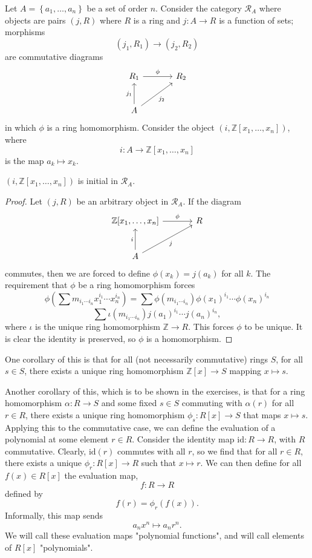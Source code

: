 Let $A=\left\{ a_1, \dots, a_n  \right\} $ be a set of order $n$. Consider the category $\mathscr{R} _A$ where objects are pairs $(j,R)$ where $R$ is a ring and $j : A \to R$ is a function of sets; morphisms
\[
	(j_1,R_1)\to (j_2,R_2)
\]
are commutative diagrams
\[\begin{tikzcd}[row sep=2.5em, column sep=3.5em]
	R_1 \arrow[r, "\phi "]&R_2\\
	A\arrow[u, "j_1"]\arrow[ru, "j_2"']
\end{tikzcd}\]
in which $\phi $ is a ring homomorphism. Consider the object $(i, \mathbb{Z}[x_1, \dots, x_n ])$, where
\[
	i : A \to \mathbb{Z}[x_1, \dots, x_n ]
\]
is the map $a_k\mapsto x_k$.
\begin{proposition}\label{prp:3.2.1}
	$(i,\mathbb{Z}[x_1, \dots, x_n ])$ is initial in $\mathscr{R} _A$.
\end{proposition}
\begin{proof}
	Let $(j,R)$ be an arbitrary object in $\mathscr{R}_A$. If the diagram
	\[\begin{tikzcd}[row sep=2.5em, column sep=3.5em]
		\mathbb{Z}[x_1, \dots, x_n ]\arrow[r, "\phi "]&R\\
		A\arrow[u, "i"]\arrow[ru, "j"']
	\end{tikzcd}\]
	commutes, then we are forced to define $\phi (x_k)=j(a_k)$ for all $k$. The requirement that $\phi $ be a ring homomorphism forces
	\[
		\phi \left( \sum m_{i_1\cdots i_n} x_1^{i_1}\cdots x_n^{i_n} \right) =\sum \phi (m_{i_1 \cdots i_n})\phi (x_1)^{i_1}\cdots \phi (x_n)^{i_n}
	\]
	\[
		\sum \iota (m_{i_1 \cdots i_n})j(a_1)^{i_1}\cdots j(a_n)^{i_n}
	,\]
	where $\iota $ is the unique ring homomorphism $\mathbb{Z}\to R$. This forces $\phi $ to be unique. It is clear the identity is preserved, so $\phi $ is a homomorphism.
\end{proof}

One corollary of this is that for all (not necessarily commutative) rings $S$, for all $s\in S$, there exists a unique ring homomorphism $\mathbb{Z}[x]\to S$ mapping $x\mapsto s$.

Another corollary of this, which is to be shown in the exercises, is that for a ring homomorphism $\alpha : R \to S$ and some fixed $s\in S$ commuting with $\alpha (r)$ for all $r\in R$, there exists a unique ring homomorphism $\phi_s : R[x] \to S$ that maps $x\mapsto s$. Applying this to the commutative case, we can define the evaluation of a polynomial at some element $r\in R$. Consider the identity map $\mathrm{id} : R \to R$, with $R$ commutative. Clearly, $\mathrm{id} (r)$ commutes with all $r$, so we find that for all $r\in R$, there exists a unique $\phi_r : R[x] \to R$ such that $x\mapsto r$. We can then define for all $f(x)\in R[x]$ the evaluation map,
\[
	f : R \to R
\]
defined by
\[
	f(r)=\phi_r(f(x))
.\]
Informally, this map sends
\[
	a_nx^n  \mapsto a_n r^n
.\]
We will call these evaluation maps "polynomial functions", and will call elements of $R[x]$ "polynomials".

